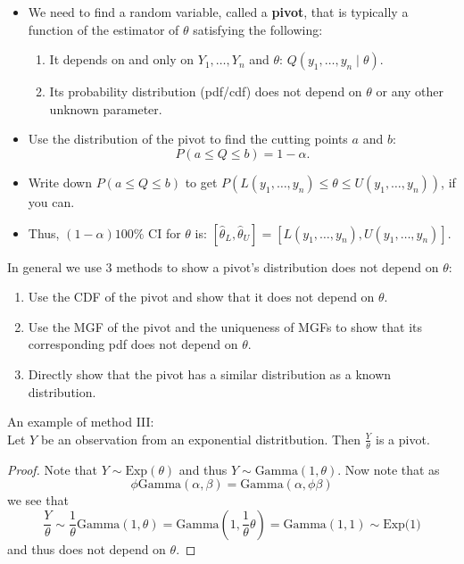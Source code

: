 \documentclass[a4paper,12pt]{article}
\theoremstyle{nonitalic}
\begin{document}
    \begin{itemize}
        \item We need to find a random variable, called a \textbf{pivot}, that is typically a function of the estimator of \(\theta\) satisfying the following:
        \begin{enumerate}
            \item It depends on and only on \(Y_1, \ldots, Y_n\) and \(\theta\): \(Q(y_1, \ldots, y_n \mid \theta)\).
            \item Its probability distribution (pdf/cdf) does not depend on \(\theta\) or any other unknown parameter.
        \end{enumerate}
        \item Use the distribution of the pivot to find the cutting points \(a\) and \(b\):
        \[
        P(a \leq Q \leq b) = 1 - \alpha.
        \]
        \item Write down \(P(a \leq Q \leq b)\) to get \(P(L(y_1, \ldots, y_n) \leq \theta \leq U(y_1, \ldots, y_n))\), if you can.
        \item Thus, \((1-\alpha)100\%\) CI for \(\theta\) is: \([\hat{\theta}_L, \hat{\theta}_U] = [L(y_1, \ldots, y_n), U(y_1, \ldots, y_n)]\).
    \end{itemize}

    \bigskip

    In general we use 3 methods to show a pivot's distribution does not depend on $\theta$:
    \begin{enumerate}
        \item Use the CDF of the pivot and show that it does not depend on $\theta$.
        \item Use the MGF of the pivot and the uniqueness of MGFs to show that its corresponding pdf does not depend on $\theta$.
        \item Directly show that the pivot has a similar distribution as a known distribution.
    \end{enumerate}

    An example of method III:\\
    Let $Y$ be an observation from an exponential distritbution. Then $\frac{Y}{\theta}$ is a pivot.
    \begin{proof}
        Note that $Y \sim \text{Exp}(\theta)$ and thus $Y \sim \text{Gamma}(1, \theta)$. Now note that as
        \[
        \phi \text{Gamma}(\alpha, \beta) = \text{Gamma}(\alpha, \phi\beta)
        \]
        we see that
        \[
        \frac{Y}{\theta} \sim \frac{1}{\theta}\text{Gamma}(1,\theta) = \text{Gamma}(1,\frac{1}{\theta}\theta) = \text{Gamma}(1, 1) \sim \text{Exp(1)}
        \]
        and thus does not depend on $\theta$.
    \end{proof}
\end{document}
